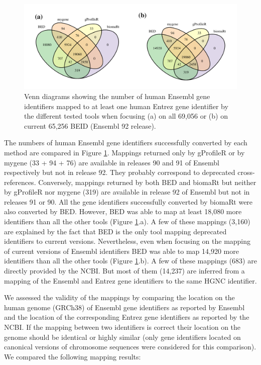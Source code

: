 \documentclass[9pt,a4paper,]{extarticle}
\theoremstyle{definition}
\theoremstyle{definition}
\theoremstyle{definition}
\theoremstyle{remark}
\begin{document}
\begin{figure}

{\centering \includegraphics[width=1\linewidth]{BED-F1000-Article_files/figure-latex/vennTools-1} 

}

\caption{Venn diagrams showing the number of human Ensembl gene identifiers mapped to at least one human Entrez gene identifier by the different tested tools when focusing (a) on all 69,056 or (b) on current 65,256 BEID (Ensembl 92 release).}\label{fig:vennTools}
\end{figure}

The numbers of human Ensembl gene identifiers successfully converted by each
method are compared in Figure \ref{fig:vennTools}.
Mappings returned only by gProfileR or by mygene
(33 + 94 + 76)
are available in releases
90 and 91 of Ensembl respectively but not in release 92.
They probably correspond to deprecated cross-references.
Conversely, mappings returned by both BED and biomaRt but neither by gProfileR
nor mygene
(319)
are available in release 92 of Ensembl but not in releases 91 or 90.
All the gene identifiers successfully converted by biomaRt were also
converted by BED.
However, BED was able to map at least
18,080 more identifiers than all the
other tools (Figure \ref{fig:vennTools}.a). A few of these mappings
(3,160)
are explained by the fact that BED is the only tool mapping
deprecated identifiers to current versions.
Nevertheless, even when focusing on the mapping of current versions of
Ensembl identifiers BED was able to
map 14,920
more identifiers than all the
other tools (Figure \ref{fig:vennTools}.b).
A few of these mappings (683)
are directly provided by the NCBI. But most of them
(14,237)
are inferred from a mapping of the Ensembl and Entrez gene identifiers
to the same HGNC \citep{gray_genenames.org:_2015} identifier.

We assessed the validity of the mappings by comparing the location on the human
genome (GRCh38) of Ensembl gene identifiers as reported by Ensembl
and the location of the corresponding Entrez gene identifiers
as reported by the NCBI. If the mapping between two identifiers is correct
their location on the genome should be identical or highly similar
(only gene identifiers located on canonical versions
of chromosome sequences were considered for this comparison).
We compared the following mapping results:
\end{document}
